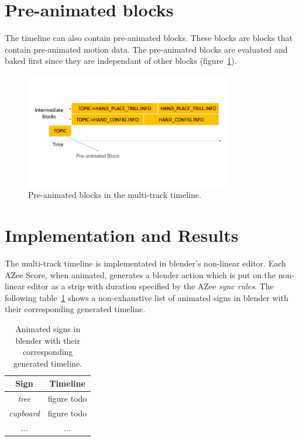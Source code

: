 \documentclass[../../main.tex]{subfiles}
\begin{document}
\section{Pre-animated blocks}
\label{ch:multi_track:preanim_blocks}

The timeline can also contain pre-animated blocks. These blocks are blocks that contain pre-animated motion data. The pre-animated blocks are evaluated and baked first since they are independant of other blocks (figure~\ref{fig:preanim_blocks}).

\begin{figure}[h]
    \centering
    \includegraphics[width=0.8\textwidth]{chapters/multi_track/images/preanim_blocks.png}
    \caption{Pre-animated blocks in the multi-track timeline.}
    \label{fig:preanim_blocks}
\end{figure}

\section{Implementation and Results}
\label{ch:multi_track:implem_results}

The multi-track timeline is implementated in blender's non-linear editor. Each AZee Score, when animated, generates a blender action which is put on the non-linear editor as a strip with duration specified by the AZee \emph{sync rules}. The following table~\ref{tab:azee_to_blender} shows a non-exhaustive list of animated signs in blender with their corresponding generated timeline.

\begin{table}[h]
    \centering
    \begin{tabular}{|c|c|}
        \hline
        \textbf{Sign} & \textbf{Timeline} \\
        \hline
        \emph{tree} & figure todo \\
        \emph{cupboard} & figure todo \\
        \emph{...} & ... \\
        \hline
    \end{tabular}
    \caption{Animated signs in blender with their corresponding generated timeline.}
    \label{tab:azee_to_blender}
\end{table}
\end{document}
